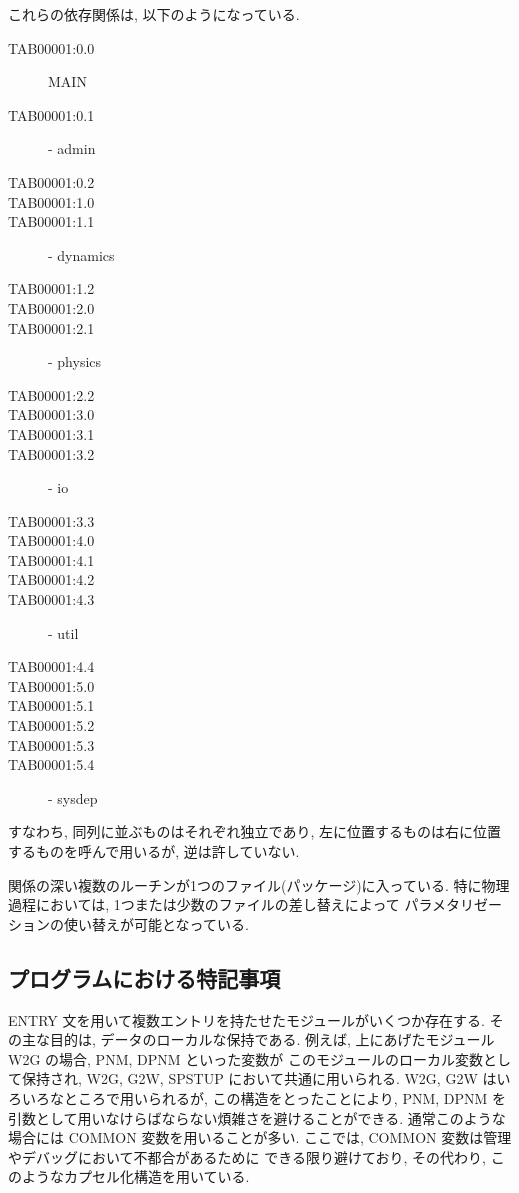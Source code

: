 \・これらの依存関係は, 以下のようになっている. 
\begin{center}
\begin{description}
\item[TAB00001:0.0] MAIN
\item[TAB00001:0.1] - admin
\item[TAB00001:0.2] 
\item[TAB00001:1.0] 
\item[TAB00001:1.1] - dynamics
\item[TAB00001:1.2] 
\item[TAB00001:2.0] 
\item[TAB00001:2.1] - physics
\item[TAB00001:2.2] 
\item[TAB00001:3.0] 
\item[TAB00001:3.1] 
\item[TAB00001:3.2] - io
\item[TAB00001:3.3] 
\item[TAB00001:4.0] 
\item[TAB00001:4.1] 
\item[TAB00001:4.2] 
\item[TAB00001:4.3] - util
\item[TAB00001:4.4] 
\item[TAB00001:5.0] 
\item[TAB00001:5.1] 
\item[TAB00001:5.2] 
\item[TAB00001:5.3] 
\item[TAB00001:5.4] - sysdep
\end{description}
\end{center}
すなわち, 同列に並ぶものはそれぞれ独立であり,
左に位置するものは右に位置するものを呼んで用いるが, 逆は許していない.

\・関係の深い複数のルーチンが1つのファイル(パッケージ)に入っている.
特に物理過程においては, 1つまたは少数のファイルの差し替えによって
パラメタリゼーションの使い替えが可能となっている.

\subsection{プログラムにおける特記事項}

\・ENTRY 文を用いて複数エントリを持たせたモジュールがいくつか存在する.
その主な目的は, データのローカルな保持である.
例えば, 上にあげたモジュール W2G の場合, PNM, DPNM といった変数が
このモジュールのローカル変数として保持され,
W2G, G2W, SPSTUP において共通に用いられる.
W2G, G2W はいろいろなところで用いられるが, この構造をとったことにより,
PNM, DPNM を引数として用いなけらばならない煩雑さを避けることができる.
通常このような場合には COMMON 変数を用いることが多い.
ここでは, COMMON 変数は管理やデバッグにおいて不都合があるために
できる限り避けており, その代わり, このようなカプセル化構造を用いている.

